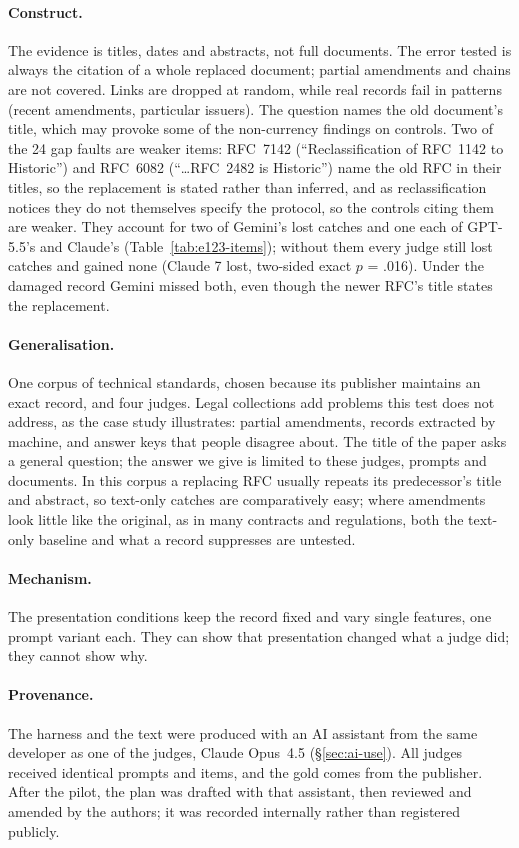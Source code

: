 \paragraph{Construct.} The evidence is titles, dates and abstracts, not full documents. The error tested is always the
citation of a whole replaced document; partial amendments and chains are not covered. Links are dropped at random,
while real records fail in patterns (recent amendments, particular issuers). The question names the old document's
title, which may provoke some of the non-currency findings on controls. Two of the 24 gap faults are weaker items:
RFC~7142 (``Reclassification of RFC~1142 to Historic'') and RFC~6082 (``\ldots RFC~2482 is Historic'') name the
old RFC in their titles, so the replacement is stated rather than inferred, and as reclassification notices they do
not themselves specify the protocol, so the controls citing them are weaker. They account for two of Gemini's lost
catches and one each of GPT-5.5's and Claude's (Table~\ref{tab:e123-items}); without them every judge still lost
catches and gained none (Claude 7 lost, two-sided exact $p$ = .016). Under the damaged record Gemini missed both,
even though the newer RFC's title states the replacement.

\paragraph{Generalisation.} One corpus of technical standards, chosen because its publisher maintains an exact
record, and four judges. Legal collections add problems this test does not address, as the case study illustrates:
partial amendments, records extracted by machine, and answer keys that people disagree about. The title of the paper
asks a general question; the answer we give is limited to these judges, prompts and documents. In this corpus a
replacing RFC usually repeats its predecessor's title and abstract, so text-only catches are comparatively easy;
where amendments look little like the original, as in many contracts and regulations, both the text-only baseline
and what a record suppresses are untested.

\paragraph{Mechanism.} The presentation conditions keep the record fixed and vary single features, one prompt variant
each. They can show that presentation changed what a judge did; they cannot show why.

\paragraph{Provenance.} The harness and the text were produced with an AI assistant from the same developer as one of
the judges, Claude Opus~4.5 (\S\ref{sec:ai-use}). All judges received identical prompts and items, and the gold comes
from the publisher. After the pilot, the plan was drafted with that assistant, then reviewed and amended by the authors; it
was recorded internally rather than registered publicly.
